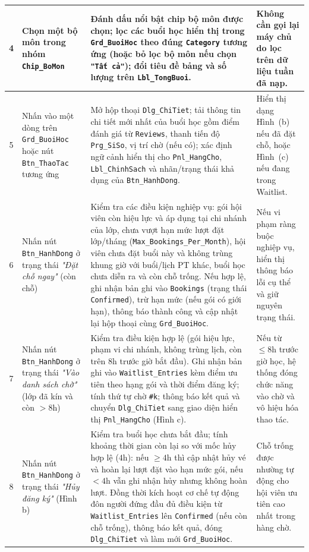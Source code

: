 \documentclass[a4paper,12pt]{article}
\begin{document}
{\begin{longtable}{|c|L{3.5cm}|L{7.8cm}|L{3.5cm}|}
4 & Chọn một bộ môn trong nhóm \texttt{Chip\_BoMon} &
Đánh dấu nổi bật chip bộ môn được chọn; lọc các buổi học hiển thị trong \texttt{Grd\_BuoiHoc} theo đúng \texttt{Category} tương ứng (hoặc bỏ lọc bộ môn nếu chọn \texttt{"Tất cả"}); đổi tiêu đề bảng và số lượng trên \texttt{Lbl\_TongBuoi}. &
Không cần gọi lại máy chủ do lọc trên dữ liệu tuần đã nạp. \\ \hline

5 & Nhấn vào một dòng trên \texttt{Grd\_BuoiHoc} hoặc nút \texttt{Btn\_ThaoTac} tương ứng &
Mở hộp thoại \texttt{Dlg\_ChiTiet}; tải thông tin chi tiết mới nhất của buổi học gồm điểm đánh giá từ \texttt{Reviews}, thanh tiến độ \texttt{Prg\_SiSo}, vị trí chờ (nếu có); xác định ngữ cảnh hiển thị cho \texttt{Pnl\_HangCho}, \texttt{Lbl\_ChinhSach} và nhãn/trạng thái khả dụng của \texttt{Btn\_HanhDong}. &
Hiển thị dạng Hình~(b) nếu đã đặt chỗ, hoặc Hình~(c) nếu đang trong Waitlist. \\ \hline

6 & Nhấn nút \texttt{Btn\_HanhDong} ở trạng thái \textit{"Đặt chỗ ngay"} (còn chỗ) &
Kiểm tra các điều kiện nghiệp vụ: gói hội viên còn hiệu lực và áp dụng tại chi nhánh của lớp, chưa vượt hạn mức lượt đặt lớp/tháng (\texttt{Max\_Bookings\_Per\_Month}), hội viên chưa đặt buổi này và không trùng khung giờ với buổi/lịch PT khác, buổi học chưa diễn ra và còn chỗ trống. Nếu hợp lệ, ghi nhận bản ghi vào \texttt{Bookings} (trạng thái \texttt{Confirmed}), trừ hạn mức (nếu gói có giới hạn), thông báo thành công và cập nhật lại hộp thoại cùng \texttt{Grd\_BuoiHoc}. &
Nếu vi phạm ràng buộc nghiệp vụ, hiển thị thông báo lỗi cụ thể và giữ nguyên trạng thái. \\ \hline

7 & Nhấn nút \texttt{Btn\_HanhDong} ở trạng thái \textit{"Vào danh sách chờ"} (lớp đã kín và còn $> 8\text{h}$) &
Kiểm tra điều kiện hợp lệ (gói hiệu lực, phạm vi chi nhánh, không trùng lịch, còn trên $8\text{h}$ trước giờ bắt đầu). Ghi nhận bản ghi vào \texttt{Waitlist\_Entries} kèm điểm ưu tiên theo hạng gói và thời điểm đăng ký; tính thứ tự chờ \texttt{\#k}; thông báo kết quả và chuyển \texttt{Dlg\_ChiTiet} sang giao diện hiển thị \texttt{Pnl\_HangCho} (Hình c). &
Nếu từ $\le 8\text{h}$ trước giờ học, hệ thống đóng chức năng vào chờ và vô hiệu hóa thao tác. \\ \hline

8 & Nhấn nút \texttt{Btn\_HanhDong} ở trạng thái \textit{"Hủy đăng ký"} (Hình b) &
Kiểm tra buổi học chưa bắt đầu; tính khoảng thời gian còn lại so với mốc hủy hợp lệ ($4\text{h}$): nếu $\ge 4\text{h}$ thì cập nhật hủy vé và hoàn lại lượt đặt vào hạn mức gói, nếu $< 4\text{h}$ vẫn ghi nhận hủy nhưng không hoàn lượt. Đồng thời kích hoạt cơ chế tự động đôn người đứng đầu đủ điều kiện từ \texttt{Waitlist\_Entries} lên \texttt{Confirmed} (nếu còn chỗ trống), thông báo kết quả, đóng \texttt{Dlg\_ChiTiet} và làm mới \texttt{Grd\_BuoiHoc}. &
Chỗ trống được nhường tự động cho hội viên ưu tiên cao nhất trong hàng chờ. \\ \hline


\end{longtable}}
\end{document}

